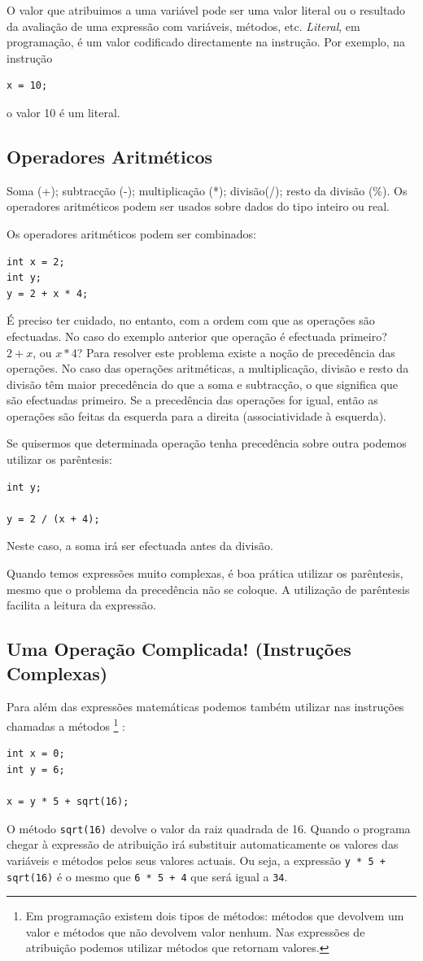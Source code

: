 O valor que atribuimos a uma variável pode ser uma valor literal ou o resultado da avaliação de uma expressão com variáveis, métodos, etc.
\emph{Literal}, em programação, é um valor codificado directamente na instrução. Por exemplo, na instrução
\begin{lstlisting}
x = 10;
\end{lstlisting}
o valor 10 é um literal. 

\subsection{Operadores Aritméticos} 
Soma (+); subtracção (-); multiplicação (*); divisão(/); resto da divisão (\%). Os operadores aritméticos podem ser usados sobre dados do tipo inteiro ou real. 

Os operadores aritméticos podem ser combinados:
\begin{lstlisting}
int x = 2;
int y;
y = 2 + x * 4;
\end{lstlisting}

É preciso ter cuidado, no entanto, com a ordem com que as operações são efectuadas. No caso do exemplo anterior que operação é efectuada primeiro? $2 + x$, ou $x * 4$?
Para resolver este problema existe a noção de precedência das operações. No caso das operações aritméticas, a multiplicação,
divisão e resto da divisão têm maior precedência do que a soma e subtracção, o que significa que são efectuadas primeiro. 
Se a precedência das operações for igual, então as operações são feitas da esquerda para a direita (associatividade à esquerda).

Se quisermos que determinada operação tenha precedência sobre outra podemos utilizar os parêntesis:
\begin{lstlisting}
int y;

y = 2 / (x + 4);
\end{lstlisting}
Neste caso, a soma irá ser efectuada antes da divisão.

Quando temos expressões muito complexas, é boa prática utilizar os parêntesis, mesmo que o problema da precedência
não se coloque. A utilização de parêntesis facilita a leitura da expressão.

\subsection{Uma Operação Complicada! (Instruções Complexas)}

Para além das expressões matemáticas podemos também utilizar nas instruções chamadas a métodos%
\footnote{Em programação existem dois tipos de métodos: métodos que devolvem um valor e métodos que não devolvem valor nenhum. Nas expressões de atribuição podemos utilizar métodos que retornam valores.}%
:
\begin{lstlisting}
int x = 0;
int y = 6;

x = y * 5 + sqrt(16);
\end{lstlisting}
O método \texttt{sqrt(16)} devolve o valor da raiz quadrada de 16. Quando o programa chegar à expressão de atribuição irá substituir automaticamente os valores das variáveis e métodos pelos seus valores actuais. Ou seja, a expressão \texttt{y * 5 + sqrt(16)} é o mesmo que \texttt{6 * 5 + 4} que será igual a \texttt{34}.


